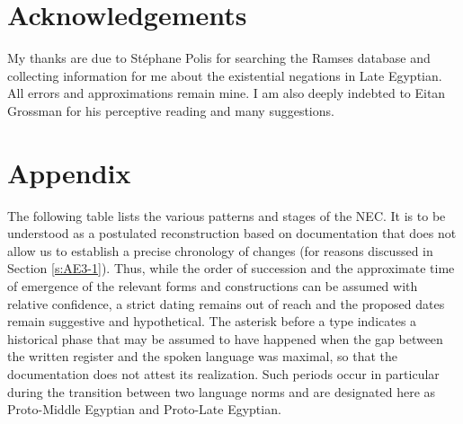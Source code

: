 \documentclass[output=paper]{langsci/langscibook}
\begin{document}
\section*{Acknowledgements}
My thanks are due to Stéphane Polis for searching the Ramses database and collecting information for me about the existential negations in Late Egyptian. All errors and approximations remain mine. I am also deeply indebted to Eitan Grossman for his perceptive reading and many suggestions. 



\section*{Appendix}

The following table lists the various patterns and stages of the NEC. It is to be understood as a postulated reconstruction based on documentation that does not allow us to establish a precise chronology of changes (for reasons discussed in Section \ref{s:AE3-1}). Thus, while the order of succession and the approximate time of emergence of the relevant forms and constructions can be assumed with relative confidence, a strict dating remains out of reach and the proposed dates remain suggestive and hypothetical. The asterisk before a type indicates a historical phase that may be assumed to have happened when the gap between the written register and the spoken language was maximal, so that the documentation does not attest its realization. Such periods occur in particular during the transition between two language norms and are designated here as Proto-Middle Egyptian and Proto-Late Egyptian.
\end{document}
